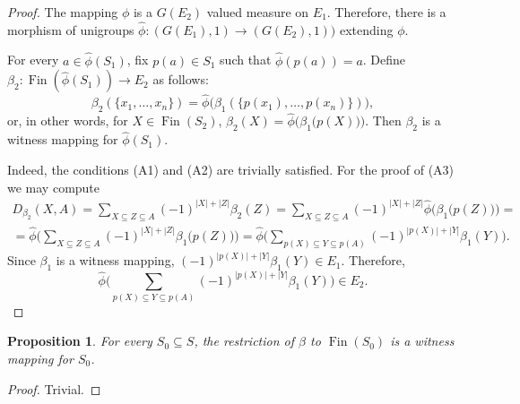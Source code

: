\documentclass[letterpaper]{amsart}
\newtheorem{proposition}{Proposition}
\theoremstyle{definition}
\DeclareMathOperator*\Fin{Fin}
\begin{document}
\begin{proof}
The mapping $\phi$ is a $G(E_2)$ valued measure on $E_1$. Therefore,
there is a morphism of unigroups $\widehat\phi:(G(E_1),1)\to(G(E_2),1))$
extending $\phi$.

For every $a\in\widehat\phi(S_1)$, fix $p(a)\in S_1$ such that $\widehat\phi(p(a))=a$.
Define $\beta_2:\Fin(\widehat\phi(S_1))\to E_2$ as follows:
$$
\beta_2(\{x_1,\dots,x_n\})=\widehat\phi\bigl(\beta_1(\{p(x_1),\dots,p(x_n)\})\bigr),
$$
or, in other words, for $X\in\Fin(S_2)$,
$\beta_2(X)=\widehat\phi\bigl(\beta_1\bigl(p(X)\bigr)\bigr)$.  Then $\beta_2$
is a witness mapping for $\widehat\phi(S_1)$.

Indeed, the conditions (A1) and (A2) are trivially satisfied. 
For the proof of (A3) we may compute
\begin{align*}
D_{\beta_2}(X,A)=\sum_{X\subseteq Z\subseteq A}(-1)^{|X|+|Z|}\beta_2(Z)=
\sum_{X\subseteq Z\subseteq A}(-1)^{|X|+|Z|}
	\widehat\phi\bigl(\beta_1\bigl(p(Z)\bigr)\bigr)=\\
=\widehat\phi\bigl(\sum_{X\subseteq Z\subseteq A}(-1)^{|X|+|Z|}\beta_1
	\bigl(p(Z)\bigr)\bigr)=
\widehat\phi\bigl(\sum_{p(X)\subseteq Y\subseteq p(A)}(-1)^{|p(X)|+|Y|}\beta_1(Y)\bigr).
\end{align*}
Since $\beta_1$ is a witness mapping,
$(-1)^{|p(X)|+|Y|}\beta_1(Y)\in E_1$. 
Therefore,
$$
\widehat\phi\bigl(\sum_{p(X)\subseteq Y\subseteq p(A)}(-1)^{|p(X)|+|Y|}\beta_1(Y)\bigr)\in E_2.
$$
\end{proof}

\begin{proposition}\label{prop:restriction}
For every $S_0\subseteq S$, the restriction of $\beta$ to $\Fin(S_0)$ is
a witness mapping for $S_0$.
\end{proposition}
\begin{proof}
Trivial.
\end{proof}
\end{document}
